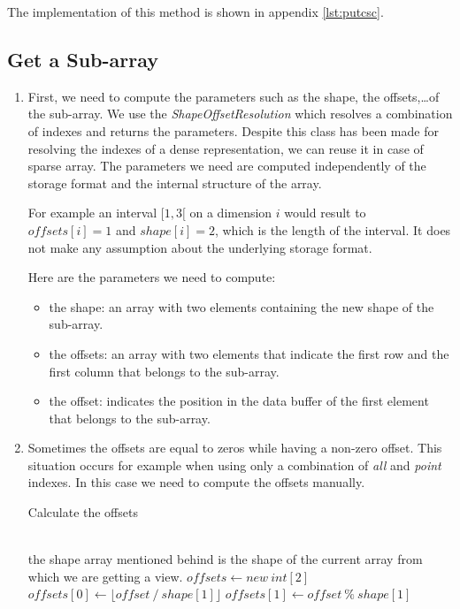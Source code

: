 The implementation of this method is shown in appendix \ref{lst:putcsc}.


\subsection{Get a Sub-array}

\begin{enumerate}
\item First, we need to compute the parameters such as the shape, the offsets,\dots of the sub-array. We use the \textit{ShapeOffsetResolution} which resolves a combination of indexes and returns the parameters. Despite this class has been made for resolving the indexes of a dense representation, we can reuse it in case of sparse array. The parameters we need are computed independently of the storage format and the internal structure of the array.

For example an interval $[1, 3[$ on a dimension $i$ would result to $offsets[i] = 1$ and $shape[i] = 2$, which is the length of the interval. It does not make any assumption about the underlying storage format.

Here are the parameters we need to compute:
\begin{itemize}
	\item the shape: an array with two elements containing the new shape of the sub-array.
	\item the offsets: an array with two elements that indicate the first row and the first column that belongs to the sub-array.
	\item the offset: indicates the position in the data buffer of the first element that belongs to the sub-array.
\end{itemize}
 \item Sometimes the offsets are equal to zeros while having a non-zero offset. This situation occurs for example when using only a combination of \textit{all} and \textit{point} indexes. In this case we need to compute the offsets manually.
  
 \begin{algorithm}
 	\caption{Calculate the offsets}
 	\label{alg:sparseOffsets2d}
 	\begin{algorithmic}
 		\\
 		\Comment the shape array mentioned behind is the shape of the current array from which we are getting a view.
	 		\State $offsets \gets new\ int[2]$
	 		\State $offsets[0] \gets \lfloor offset\ /\ shape[1]\rfloor$
	 		\State $offsets[1] \gets offset\ \%\ shape[1]$
 		\EndProcedure
 	\end{algorithmic}
 \end{algorithm}
 

\end{enumerate}
